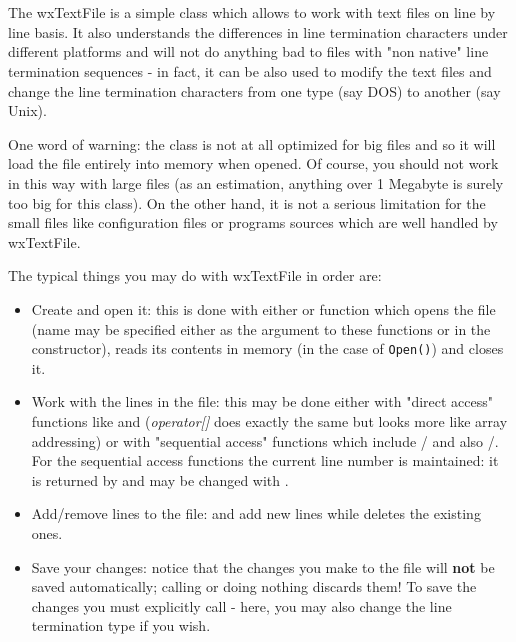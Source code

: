 \section{}\label{wxtextfile}

The wxTextFile is a simple class which allows to work with text files on line by
line basis. It also understands the differences in line termination characters
under different platforms and will not do anything bad to files with "non
native" line termination sequences - in fact, it can be also used to modify the
text files and change the line termination characters from one type (say DOS) to
another (say Unix).

One word of warning: the class is not at all optimized for big files and so it
will load the file entirely into memory when opened. Of course, you should not
work in this way with large files (as an estimation, anything over 1 Megabyte is
surely too big for this class). On the other hand, it is not a serious
limitation for the small files like configuration files or programs sources
which are well handled by wxTextFile.

The typical things you may do with wxTextFile in order are:

\begin{itemize}\itemsep=0pt
\item Create and open it: this is done with either 
 or  
function which opens the file (name may be specified either as the argument to
these functions or in the constructor), reads its contents in memory (in the
case of {\tt Open()}) and closes it.
\item Work with the lines in the file: this may be done either with "direct
access" functions like  and 
 ({\it operator[]} does exactly the same
but looks more like array addressing) or with "sequential access" functions
which include /
 and also 
/.
For the sequential access functions the current line number is maintained: it is
returned by  and may be
changed with .
\item Add/remove lines to the file:  and 
 add new lines while 
 deletes the existing ones.
\item Save your changes: notice that the changes you make to the file will {\bf
not} be saved automatically; calling  or doing
nothing discards them! To save the changes you must explicitly call 
 - here, you may also change the line
termination type if you wish.
\end{itemize}

